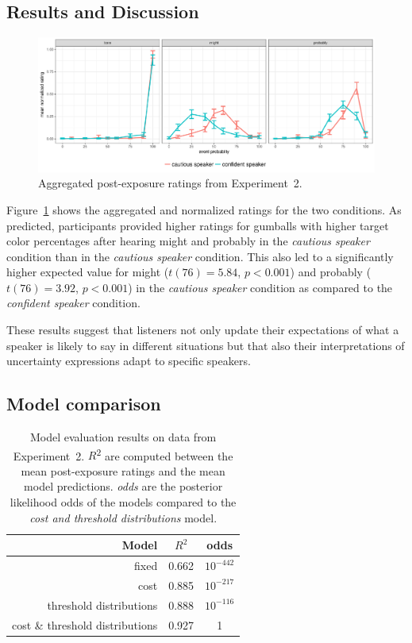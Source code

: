 \documentclass[lucida,biblatex]{sp} %
\begin{document}
\subsection{Results and Discussion}

\begin{figure}
\includegraphics[width=\textwidth]{plots/exp-2-ratings.pdf}
\caption{Aggregated post-exposure ratings from Experiment~2.  \label{fig:adaptation-results-comp}}
\end{figure}

Figure~\ref{fig:adaptation-results-comp} shows the aggregated and normalized ratings for the two conditions.  As predicted, participants provided higher ratings for gumballs with higher target color percentages after hearing {\sc might} and {\sc probably} in the \emph{cautious speaker} condition than in the \emph{cautious speaker} condition. This also led to a significantly higher expected value for {\sc might} ($t(76)=5.84$, $p<0.001$) and {\sc probably} ($t(76)=3.92$, $p<0.001$) in the \emph{cautious speaker} condition as compared to the \emph{confident speaker} condition.

These results suggest that listeners not only update their expectations of what a speaker is likely to say in different situations but that also their interpretations of uncertainty expressions adapt to specific speakers.

\subsection{Model comparison}

\begin{table}
\center
\begin{tabular}{r | c | c }
Model & $R^2$ &   odds  \\ \midrule
fixed & 0.662 & $10^{-442}$    \\
cost & 0.885 &  $10^{-217}$  \\
threshold distributions & 0.888 & $10^{-116}$  \\
cost \& threshold distributions & 0.927 & 1 \\
\end{tabular}
\caption{Model evaluation results on data from Experiment~2.  $R$\textsuperscript{$2$} are computed between  the mean post-exposure ratings and the mean model predictions. \textit{odds} are the posterior likelihood odds of the models compared to the \textit{cost and threshold distributions} model.  \label{tbl:model-comparison-comp}}
\end{table}
\end{document}
